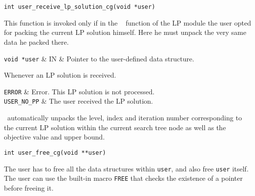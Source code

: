 
\begin{verbatim}
int user_receive_lp_solution_cg(void *user)
\end{verbatim}

\bd

\describe

This function is invoked only if in the {\tt
{}} function
of the LP module the user opted for packing the current LP solution
himself. Here he must unpack the very same data he packed there.

\args

{\tt void *user} & IN & Pointer to the user-defined data structure. \\
\et

\item[Invoked from:] Whenever an LP solution is received.

\returns

{\tt ERROR} & Error. This LP solution is not processed. \\
{\tt USER\_NO\_PP} & The user received the LP solution. \\
\et

\item[Note:] \hfill

\BB\ automatically unpacks the level, index and iteration number
corresponding to the current LP solution within the current search tree node
as well as the objective value and upper bound.

\ed

\vspace{1ex}


\begin{verbatim}
int user_free_cg(void **user)
\end{verbatim}

\bd

\describe

The user has to free all the data structures within {\tt user}, and also free
{\tt user} itself. The user can use the built-in macro {\tt FREE} that checks
the existence of a pointer before freeing it. 

